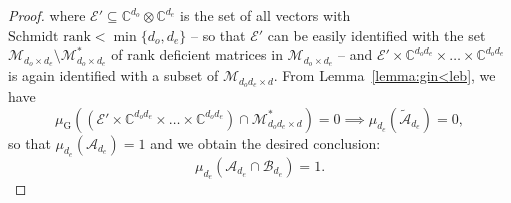 \documentclass[a4paper,onecolumn,10pt,accepted=2022-07-11]{quantumarticle}
\newcommand{\M}[1]{\mathcal{M}_{#1}}
\newcommand{\C}[1]{\mathbb{C}^{#1}}
\newcommand{\gin}{\operatorname{G}}
\theoremstyle{definition}
\begin{document}
\begin{proof}
where $\mathcal{E}'\subseteq \C{d_o}\otimes \C{d_e}$ is the set of all vectors with $\text{Schmidt rank}<\min\{d_o,d_e\}$ -- so that $\mathcal{E}'$ can be easily identified with the set $\M{d_o\times d_e}\setminus \mathcal{M}^*_{d_o\times d_e}$ of rank deficient matrices in $\M{d_o\times d_e}$ -- and $\mathcal{E}'\times \C{d_o d_e}\times \ldots \times \C{d_o d_e}$ is again identified with a subset of $\M{d_o d_e \times d}$. From Lemma~\ref{lemma:gin<leb}, we have
\begin{equation*}
    \mu_{\gin}\left((\mathcal{E}' \times \C{d_od_e}\times \ldots \times \C{d_od_e}) \cap \mathcal{M}^*_{d_od_e \times d}\right)=0\implies  \mu_{d_e}(\widetilde{\mathcal{A}}_{d_e})=0,
\end{equation*}
so that $\mu_{d_e}(\mathcal{A}_{d_e}) = 1$ and we obtain the desired conclusion:
\begin{equation*}
    \mu_{d_e}(\mathcal{A}_{d_e} \cap \mathcal{B}_{d_e})=1.
\end{equation*}
\end{proof}





\end{document}
